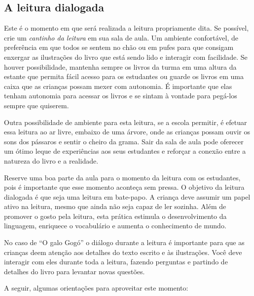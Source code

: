 \documentclass[11pt]{extarticle}
\begin{document}
\subsection{A leitura dialogada}
Este é o momento em que será realizada a leitura propriamente dita. 
Se possível, crie um \textit{cantinho da leitura} em sua sala de aula. Um 
ambiente confortável, de preferência em que todos se sentem no chão ou 
em pufes para que consigam enxergar as ilustrações do livro que está 
sendo lido e interagir com facilidade. Se houver possibilidade, mantenha 
sempre os livros da turma em uma altura da estante que permita fácil 
acesso para os estudantes ou guarde os livros em uma caixa que as crianças 
possam mexer com autonomia. É importante que elas tenham autonomia para 
acessar os livros e se sintam à vontade para pegá-los sempre que quiserem. 


Outra possibilidade de ambiente para esta leitura, se a escola permitir, 
é efetuar essa leitura ao ar livre, embaixo de uma árvore, onde as crianças 
possam ouvir os sons dos pássaros e sentir o cheiro da grama. Sair da sala 
de aula pode oferecer um ótimo leque de experiências aos seus estudantes e 
reforçar a conexão entre a natureza do livro e a realidade.  

Reserve uma boa parte da aula para o momento da leitura com os estudantes, 
pois é importante que esse momento aconteça sem pressa. O objetivo da 
leitura dialogada é que seja uma leitura em bate-papo. A criança deve 
assumir um papel ativo na leitura, mesmo que ainda não seja capaz de 
ler sozinha. Além de promover o gosto pela leitura, esta prática estimula 
o desenvolvimento da linguagem, enriquece o vocabulário e 
aumenta o conhecimento de mundo.

No caso de ``O galo Gogó'' o diálogo durante a leitura é 
importante para que as crianças deem atenção aos detalhes
do texto escrito e às ilustrações.
Você deve interagir com eles durante toda a 
leitura, fazendo perguntas e partindo de detalhes do livro para 
levantar novas questões. 

A seguir, algumas orientações para aproveitar este momento: 
\end{document}
